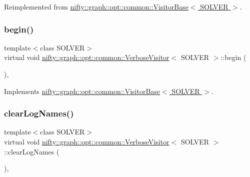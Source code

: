 Reimplemented from \hyperlink{classnifty_1_1graph_1_1opt_1_1common_1_1VisitorBase_acc4f1b419303965b0313ca83c6a7a420}{nifty\+::graph\+::opt\+::common\+::\+Visitor\+Base$<$ S\+O\+L\+V\+E\+R $>$}.

\mbox{\label{classnifty_1_1graph_1_1opt_1_1common_1_1VerboseVisitor_a94bdc19115ed1cedceb2811654983293}} 
\subsubsection{\texorpdfstring{begin()}{begin()}}
{\footnotesize\ttfamily template$<$class S\+O\+L\+V\+ER$>$ \\
virtual void \hyperlink{classnifty_1_1graph_1_1opt_1_1common_1_1VerboseVisitor}{nifty\+::graph\+::opt\+::common\+::\+Verbose\+Visitor}$<$ S\+O\+L\+V\+ER $>$\+::begin (\begin{DoxyParamCaption}\item[{\hyperlink{classnifty_1_1graph_1_1opt_1_1common_1_1VisitorBase_a433d03139897d4aefe27315b2bbb3adc}{Solver\+Type} $\ast$}]{ }\end{DoxyParamCaption})\hspace{0.3cm}{\ttfamily [inline]}, {\ttfamily [virtual]}}



Implements \hyperlink{classnifty_1_1graph_1_1opt_1_1common_1_1VisitorBase_a8c4462a0cd838b0082f7157ad4b2d770}{nifty\+::graph\+::opt\+::common\+::\+Visitor\+Base$<$ S\+O\+L\+V\+E\+R $>$}.

\mbox{\label{classnifty_1_1graph_1_1opt_1_1common_1_1VerboseVisitor_a0df0016f1f72819de000a57538426969}} 
\subsubsection{\texorpdfstring{clear\+Log\+Names()}{clearLogNames()}}
{\footnotesize\ttfamily template$<$class S\+O\+L\+V\+ER$>$ \\
virtual void \hyperlink{classnifty_1_1graph_1_1opt_1_1common_1_1VerboseVisitor}{nifty\+::graph\+::opt\+::common\+::\+Verbose\+Visitor}$<$ S\+O\+L\+V\+ER $>$\+::clear\+Log\+Names (\begin{DoxyParamCaption}{ }\end{DoxyParamCaption})\hspace{0.3cm}{\ttfamily [inline]}, {\ttfamily [virtual]}}



